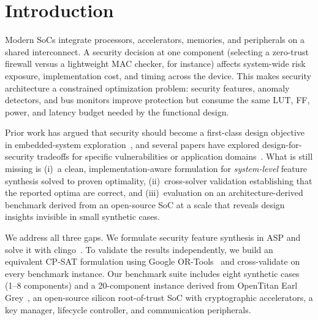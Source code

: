 \documentclass[conference]{IEEEtran}
\begin{document}
\section{Introduction}

Modern SoCs integrate processors, accelerators, memories, and
peripherals on a shared interconnect. A security decision at one
component (selecting a zero-trust firewall versus a
lightweight MAC checker, for instance) affects system-wide risk exposure,
implementation cost, and timing across the device. This makes
security architecture a constrained optimization problem: security
features, anomaly detectors, and bus monitors improve protection but
consume the same LUT, FF, power, and latency budget needed by the
functional design.

Prior work has argued that security should become a first-class
design objective in embedded-system
exploration~\cite{pimentel_case_2020}, and several papers have
explored design-for-security tradeoffs for specific vulnerabilities or
application domains~\cite{stierand_integrating_2014,
liu_hardware_2015, rajmohan_hybrid_2020, gressl_security_2019,
gressl_design_2021, linares_design_2021, mahfuz_x-dfs_2025}. What is
still missing is (i)~a clean, implementation-aware formulation for
\emph{system-level} feature synthesis solved to proven optimality,
(ii)~cross-solver validation establishing that the reported optima are
correct, and (iii)~evaluation on an architecture-derived benchmark
derived from an open-source SoC at a scale that reveals design
insights invisible in small synthetic cases.

We address all three gaps. We formulate security feature synthesis
in ASP and solve it with clingo~\cite{gebser_potassco_2011}. To
validate the results independently, we build an equivalent CP-SAT
formulation using Google OR-Tools~\cite{ortools} and cross-validate
on every benchmark instance. Our benchmark suite
includes eight synthetic cases (1--8 components) and a 20-component
instance derived from OpenTitan Earl Grey~\cite{opentitan_repo}, an
open-source silicon root-of-trust SoC with cryptographic accelerators,
a key manager, lifecycle controller, and communication peripherals.
\end{document}
